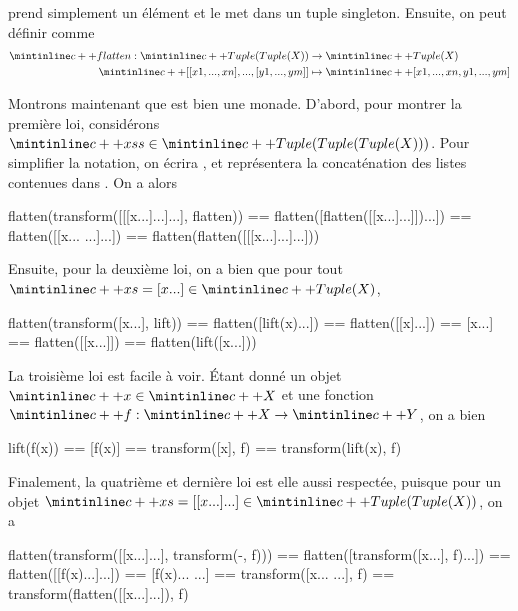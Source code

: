  prend simplement un élément et le met dans un tuple singleton.
Ensuite, on peut définir  comme
\begin{align*}
    \cc{flatten} : \cc{Tuple(Tuple(X))} &\to \cc{Tuple(X)} \\
                   \cc{[[x1, ..., xn], ..., [y1, ..., ym]]} &\mapsto \cc{[x1, ..., xn, y1, ..., ym]}
\end{align*}

Montrons maintenant que  est bien une monade. D'abord, pour montrer
la première loi, considérons $\cc{xss} \in \cc{Tuple(Tuple(Tuple(X)))}$. Pour
simplifier la notation, on écrira , et 
représentera la concaténation des listes contenues dans \cc{[[x...]...]}.
On a alors
\begin{cpp}
    flatten(transform([[[x...]...]...], flatten))
        == flatten([flatten([[x...]...]])...])
        == flatten([[x... ...]...])
        == flatten(flatten([[[x...]...]...]))
\end{cpp}

Ensuite, pour la deuxième loi, on a bien que pour tout
$\cc{xs = [x...]} \in \cc{Tuple(X)}$,
\begin{cpp}
    flatten(transform([x...], lift)) == flatten([lift(x)...])
                                     == flatten([[x]...])
                                     == [x...]
                                     == flatten([[x...]])
                                     == flatten(lift([x...]))
\end{cpp}

La troisième loi est facile à voir. Étant donné un objet $\cc{x} \in \cc{X}$
et une fonction $\cc{f} : \cc{X} \to \cc{Y}$, on a bien
\begin{cpp}
    lift(f(x)) == [f(x)]
               == transform([x], f)
               == transform(lift(x), f)
\end{cpp}

Finalement, la quatrième et dernière loi est elle aussi respectée, puisque
pour un objet $\cc{xs = [[x...]...]} \in \cc{Tuple(Tuple(X))}$, on a
\begin{cpp}
    flatten(transform([[x...]...], transform(-, f)))
                        == flatten([transform([x...], f)...])
                        == flatten([[f(x)...]...])
                        == [f(x)... ...]
                        == transform([x... ...], f)
                        == transform(flatten([[x...]...]), f)
\end{cpp}
